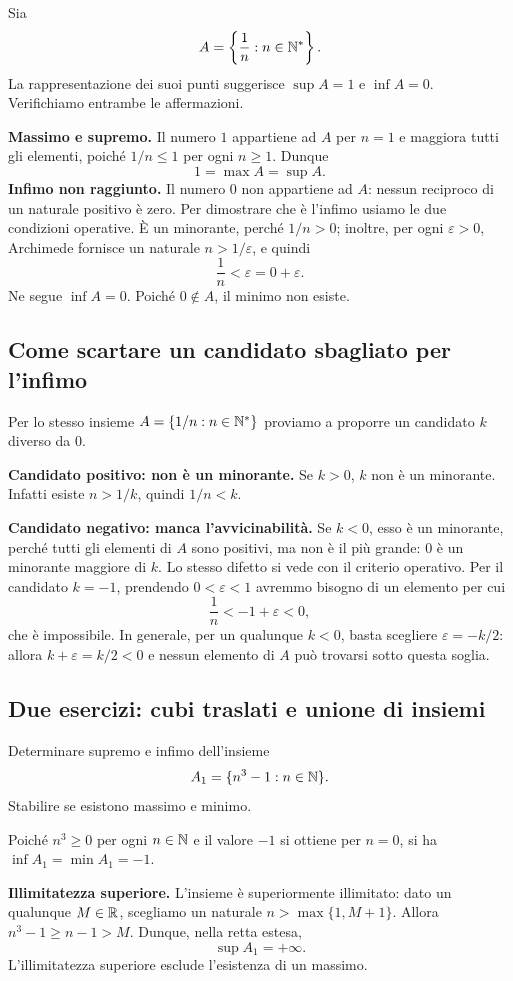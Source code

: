 \begin{esempio}
Sia
\[
  A=\left\{\frac1n:n\in\mathbb{N}^*\right\}.
\]
La rappresentazione dei suoi punti suggerisce $\sup A=1$ e $\inf A=0$. Verifichiamo entrambe le affermazioni.

\textbf{Massimo e supremo.} Il numero $1$ appartiene ad $A$ per $n=1$ e maggiora tutti gli elementi, poiché $1/n\le1$ per ogni $n\ge1$. Dunque
\[
  1=\max A=\sup A.
\]
\textbf{Infimo non raggiunto.} Il numero $0$ non appartiene ad $A$: nessun reciproco di un naturale positivo è zero. Per dimostrare che è l'infimo usiamo le due condizioni operative. È un minorante, perché $1/n>0$; inoltre, per ogni $\varepsilon>0$, Archimede fornisce un naturale $n>1/\varepsilon$, e quindi
\[
  \frac1n<\varepsilon=0+\varepsilon.
\]
Ne segue $\inf A=0$. Poiché $0\notin A$, il minimo non esiste.
\end{esempio}

\subsection{Come scartare un candidato sbagliato per l'infimo}

Per lo stesso insieme $A=\{1/n:n\in\mathbb{N}^*\}$ proviamo a proporre un candidato $k$ diverso da $0$.

\textbf{Candidato positivo: non è un minorante.} Se $k>0$, $k$ non è un minorante. Infatti esiste $n>1/k$, quindi $1/n<k$.

\textbf{Candidato negativo: manca l’avvicinabilità.} Se $k<0$, esso è un minorante, perché tutti gli elementi di $A$ sono positivi, ma non è il più grande: $0$ è un minorante maggiore di $k$. Lo stesso difetto si vede con il criterio operativo. Per il candidato $k=-1$, prendendo $0<\varepsilon<1$ avremmo bisogno di un elemento per cui
\[
  \frac1n<-1+\varepsilon<0,
\]
che è impossibile. In generale, per un qualunque $k<0$, basta scegliere $\varepsilon=-k/2$: allora $k+\varepsilon=k/2<0$ e nessun elemento di $A$ può trovarsi sotto questa soglia.

\subsection{Due esercizi: cubi traslati e unione di insiemi}

\begin{esercizio}
Determinare supremo e infimo dell'insieme
\[
  A_1=\{n^3-1:n\in\mathbb{N}\}.
\]
Stabilire se esistono massimo e minimo.
\end{esercizio}
\begin{svolgimento}
Poiché $n^3\ge0$ per ogni $n\in\mathbb{N}$ e il valore $-1$ si ottiene per $n=0$, si ha $\inf A_1=\min A_1=-1$.

\textbf{Illimitatezza superiore.} L'insieme è superiormente illimitato: dato un qualunque $M\in\mathbb{R}$, scegliamo un naturale $n>\max\{1,M+1\}$. Allora $n^3-1\ge n-1>M$. Dunque, nella retta estesa,
\[
  \sup A_1=+\infty.
\]
L'illimitatezza superiore esclude l'esistenza di un massimo.
\end{svolgimento}

